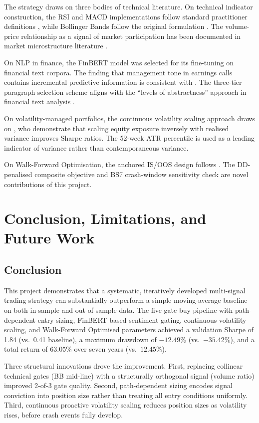 \documentclass[11pt,twoside,a4paper]{article}
\begin{document}
The strategy draws on three bodies of technical literature. On technical indicator construction, the RSI and MACD implementations follow standard practitioner definitions \citep{Wilder1978}, while Bollinger Bands follow the original formulation \citep{Bollinger2002}. The volume-price relationship as a signal of market participation has been documented in market microstructure literature \citep{Blume1994}.

On NLP in finance, the FinBERT model \citep{Araci2019} was selected for its fine-tuning on financial text corpora. The finding that management tone in earnings calls contains incremental predictive information is consistent with \citet{Huang2014}. The three-tier paragraph selection scheme aligns with the ``levels of abstractness'' approach in financial text analysis \citep{Loughran2011}.

On volatility-managed portfolios, the continuous volatility scaling approach draws on \citet{Moreira2017}, who demonstrate that scaling equity exposure inversely with realised variance improves Sharpe ratios. The 52-week ATR percentile is used as a leading indicator of variance rather than contemporaneous variance.

On Walk-Forward Optimisation, the anchored IS/OOS design follows \citet{Pardo2008}. The DD-penalised composite objective and BS7 crash-window sensitivity check are novel contributions of this project.

\clearpage
\section{Conclusion, Limitations, and Future Work}

\subsection{Conclusion}

This project demonstrates that a systematic, iteratively developed multi-signal trading strategy can substantially outperform a simple moving-average baseline on both in-sample and out-of-sample data. The five-gate buy pipeline with path-dependent entry sizing, FinBERT-based sentiment gating, continuous volatility scaling, and Walk-Forward Optimised parameters achieved a validation Sharpe of 1.84 (vs.\ 0.41 baseline), a maximum drawdown of $-12.49\%$ (vs.\ $-35.42\%$), and a total return of $63.05\%$ over seven years (vs.\ $12.45\%$).

Three structural innovations drove the improvement. First, replacing collinear technical gates (BB mid-line) with a structurally orthogonal signal (volume ratio) improved 2-of-3 gate quality. Second, path-dependent sizing encodes signal conviction into position size rather than treating all entry conditions uniformly. Third, continuous proactive volatility scaling reduces position sizes as volatility rises, before crash events fully develop.
\end{document}
